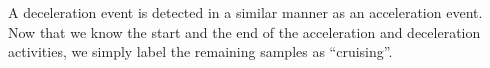 \cstartd
A deceleration event is detected in a similar manner as an acceleration event. 
\cstartf Now that we know the start and the end of the acceleration and deceleration activities, we simply label the remaining samples as ``cruising''. \cendf

